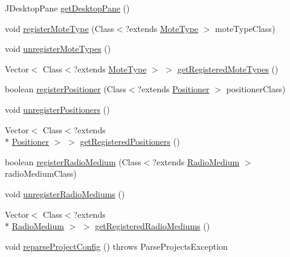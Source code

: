 \begin{DoxyCompactItemize}
\item 
J\-Desktop\-Pane \hyperlink{classorg_1_1contikios_1_1cooja_1_1Cooja_a02373668fc0ed84dc82dce4e031797c6}{get\-Desktop\-Pane} ()
\item 
void \hyperlink{classorg_1_1contikios_1_1cooja_1_1Cooja_acfbfd65613092e0b6fa743225cd577dc}{register\-Mote\-Type} (Class$<$?extends \hyperlink{interfaceorg_1_1contikios_1_1cooja_1_1MoteType}{Mote\-Type} $>$ mote\-Type\-Class)
\item 
void \hyperlink{classorg_1_1contikios_1_1cooja_1_1Cooja_ac350cadcee44d4660a3dc48e173207d3}{unregister\-Mote\-Types} ()
\item 
Vector$<$ Class$<$?extends \hyperlink{interfaceorg_1_1contikios_1_1cooja_1_1MoteType}{Mote\-Type} $>$ $>$ \hyperlink{classorg_1_1contikios_1_1cooja_1_1Cooja_a1e1841a06fec0ed49c524ac00710e897}{get\-Registered\-Mote\-Types} ()
\item 
boolean \hyperlink{classorg_1_1contikios_1_1cooja_1_1Cooja_aea29601f32712fcd5ddecd9711d55042}{register\-Positioner} (Class$<$?extends \hyperlink{classorg_1_1contikios_1_1cooja_1_1Positioner}{Positioner} $>$ positioner\-Class)
\item 
void \hyperlink{classorg_1_1contikios_1_1cooja_1_1Cooja_a73e4e8644e64b139128d40dce23896ca}{unregister\-Positioners} ()
\item 
Vector$<$ Class$<$?extends \\*
\hyperlink{classorg_1_1contikios_1_1cooja_1_1Positioner}{Positioner} $>$ $>$ \hyperlink{classorg_1_1contikios_1_1cooja_1_1Cooja_a502832bf7d93eae626274b641e4455f2}{get\-Registered\-Positioners} ()
\item 
boolean \hyperlink{classorg_1_1contikios_1_1cooja_1_1Cooja_a02d732370374ce1fc92fc731fb65d0b9}{register\-Radio\-Medium} (Class$<$?extends \hyperlink{classorg_1_1contikios_1_1cooja_1_1RadioMedium}{Radio\-Medium} $>$ radio\-Medium\-Class)
\item 
void \hyperlink{classorg_1_1contikios_1_1cooja_1_1Cooja_a9ae78c7e59efbf14f593d91d81430158}{unregister\-Radio\-Mediums} ()
\item 
Vector$<$ Class$<$?extends \\*
\hyperlink{classorg_1_1contikios_1_1cooja_1_1RadioMedium}{Radio\-Medium} $>$ $>$ \hyperlink{classorg_1_1contikios_1_1cooja_1_1Cooja_a4075ce3766cb2bbc40d2a3ddadd0189d}{get\-Registered\-Radio\-Mediums} ()
\item 
void \hyperlink{classorg_1_1contikios_1_1cooja_1_1Cooja_ae37f9adabef8d3f5186d2c71550dee7b}{reparse\-Project\-Config} ()  throws Parse\-Projects\-Exception 

\end{DoxyCompactItemize}
